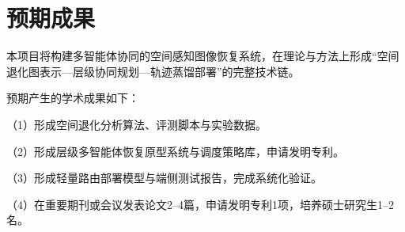 \section{预期成果}

本项目将构建多智能体协同的空间感知图像恢复系统，在理论与方法上形成“空间退化图表示—层级协同规划—轨迹蒸馏部署”的完整技术链。

预期产生的学术成果如下：

（1）形成空间退化分析算法、评测脚本与实验数据。

（2）形成层级多智能体恢复原型系统与调度策略库，申请发明专利。

（3）形成轻量路由部署模型与端侧测试报告，完成系统化验证。

（4）在重要期刊或会议发表论文2--4篇，申请发明专利1项，培养硕士研究生1--2名。
